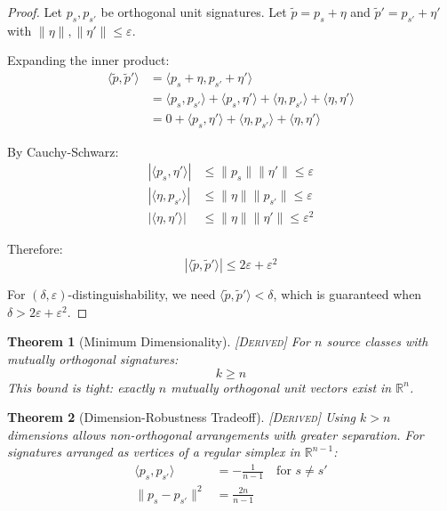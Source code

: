 \documentclass[11pt,a4paper]{article}
\theoremstyle{plain}
\newtheorem{theorem}{Theorem}[section]
\theoremstyle{definition}
\theoremstyle{remark}
\newcommand{\R}{\mathbb{R}}
\newcommand{\ip}[2]{\langle #1, #2 \rangle}
\newcommand{\norm}[1]{\| #1 \|}
\newcommand{\derived}{\textsc{[Derived]}}
\begin{document}
\begin{proof}
Let $p_s, p_{s'}$ be orthogonal unit signatures. Let $\tilde{p} = p_s + \eta$ and $\tilde{p}' = p_{s'} + \eta'$ with $\norm{\eta}, \norm{\eta'} \leq \varepsilon$.

Expanding the inner product:
\begin{align}
\ip{\tilde{p}}{\tilde{p}'} &= \ip{p_s + \eta}{p_{s'} + \eta'} \\
&= \ip{p_s}{p_{s'}} + \ip{p_s}{\eta'} + \ip{\eta}{p_{s'}} + \ip{\eta}{\eta'} \\
&= 0 + \ip{p_s}{\eta'} + \ip{\eta}{p_{s'}} + \ip{\eta}{\eta'}
\end{align}

By Cauchy-Schwarz:
\begin{align}
|\ip{p_s}{\eta'}| &\leq \norm{p_s}\norm{\eta'} \leq \varepsilon \\
|\ip{\eta}{p_{s'}}| &\leq \norm{\eta}\norm{p_{s'}} \leq \varepsilon \\
|\ip{\eta}{\eta'}| &\leq \norm{\eta}\norm{\eta'} \leq \varepsilon^2
\end{align}

Therefore:
\begin{equation}
|\ip{\tilde{p}}{\tilde{p}'}| \leq 2\varepsilon + \varepsilon^2
\end{equation}

For $(\delta, \varepsilon)$-distinguishability, we need $\ip{\tilde{p}}{\tilde{p}'} < \delta$, which is guaranteed when $\delta > 2\varepsilon + \varepsilon^2$.
\end{proof}

\begin{theorem}[Minimum Dimensionality] \label{thm:dim} \derived
For $n$ source classes with mutually orthogonal signatures:
\begin{equation}
k \geq n
\end{equation}
This bound is tight: exactly $n$ mutually orthogonal unit vectors exist in $\R^n$.
\end{theorem}

\begin{theorem}[Dimension-Robustness Tradeoff] \label{thm:tradeoff} \derived
Using $k > n$ dimensions allows non-orthogonal arrangements with greater separation. For signatures arranged as vertices of a regular simplex in $\R^{n-1}$:
\begin{align}
\ip{p_s}{p_{s'}} &= -\frac{1}{n-1} \quad \text{for } s \neq s' \\
\norm{p_s - p_{s'}}^2 &= \frac{2n}{n-1}
\end{align}
\end{theorem}
\end{document}
